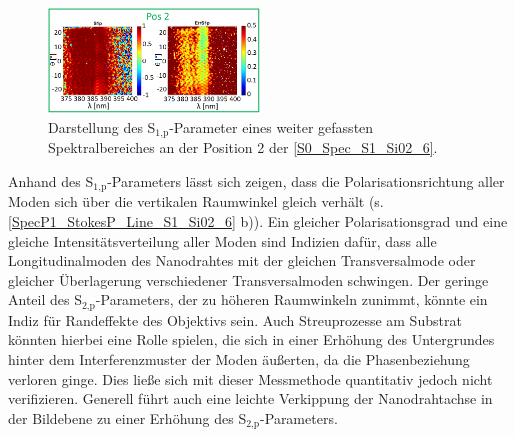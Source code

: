 \begin{figure}[b]
\includegraphics[width=0.5\textwidth]{Bilder/SiO2/compSpec_2_S1p}
\caption{Darstellung des S$_\text{1,p}$-Parameter eines weiter gefassten Spektralbereiches an der Position 2 der \autoref{S0_Spec_S1_Si02_6}.}
\label{compSpec_2_S1p}
\end{figure}Anhand des S$_\text{1,p}$-Parameters lässt sich zeigen, dass die Polarisationsrichtung aller Moden sich über die vertikalen Raumwinkel gleich verhält (s. \autoref{SpecP1_StokesP_Line_S1_Si02_6} b)). Ein gleicher Polarisationsgrad und eine gleiche Intensitätsverteilung aller Moden sind Indizien dafür, dass alle Longitudinalmoden des Nanodrahtes mit der gleichen Transversalmode oder gleicher Überlagerung verschiedener Transversalmoden schwingen. Der geringe Anteil des S$_\text{2,p}$-Parameters, der zu höheren Raumwinkeln zunimmt, könnte ein Indiz für Randeffekte des Objektivs sein. Auch Streuprozesse am Substrat könnten hierbei eine Rolle spielen, die sich in einer Erhöhung des Untergrundes hinter dem Interferenzmuster der Moden äußerten, da die Phasenbeziehung verloren ginge. Dies ließe sich mit dieser Messmethode quantitativ jedoch nicht verifizieren. Generell führt auch eine leichte Verkippung der Nanodrahtachse in der Bildebene zu einer Erhöhung des S$_\text{2,p}$-Parameters.\\

